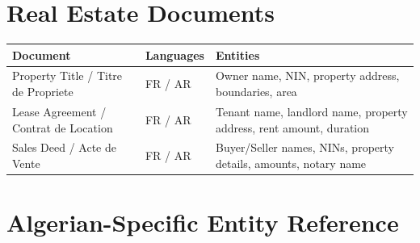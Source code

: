 \documentclass[11pt,a4paper]{article}
\begin{document}
\section{Real Estate Documents}

\begin{longtable}{|p{4.5cm}|p{2.5cm}|p{8.5cm}|}
\hline
\textbf{Document} & \textbf{Languages} & \textbf{Entities} \\
\hline
\endhead

Property Title / Titre de Propriete
&
FR / AR
&
Owner name, NIN, property address, boundaries, area
\\ \hline

Lease Agreement / Contrat de Location
&
FR / AR
&
Tenant name, landlord name, property address, rent amount, duration
\\ \hline

Sales Deed / Acte de Vente
&
FR / AR
&
Buyer/Seller names, NINs, property details, amounts, notary name
\\ \hline

\end{longtable}

\newpage

\section{Algerian-Specific Entity Reference}
\end{document}
